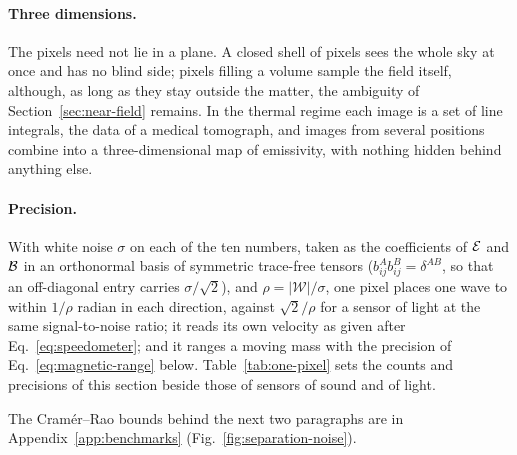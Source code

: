 \paragraph{Three dimensions.} The pixels need not lie in a plane. A closed
shell of pixels sees the whole sky at once and has no blind side; pixels
filling a volume sample the field itself, although, as long as they stay
outside the matter, the ambiguity of Section~\ref{sec:near-field} remains. In
the thermal regime each image is a set of line integrals, the data of a medical
tomograph, and images from several positions combine into a three-dimensional
map of emissivity, with nothing hidden behind anything else.

\paragraph{Precision.} With white noise $\sigma$ on each of the ten numbers,
taken as the coefficients of $\mathcal{E}$ and $\mathcal{B}$ in an orthonormal basis of
symmetric trace-free tensors ($b^A_{ij}b^B_{ij} = \delta^{AB}$, so that an
off-diagonal entry carries $\sigma/\sqrt2$), and $\rho = |\mathcal{W}|/\sigma$, one pixel places one wave to within $1/\rho$ radian in
each direction, against $\sqrt2/\rho$ for a sensor of light at the same
signal-to-noise ratio; it reads its own velocity as given after
Eq.~\eqref{eq:speedometer}; and it ranges a moving mass with the precision of
Eq.~\eqref{eq:magnetic-range} below. Table~\ref{tab:one-pixel} sets the
counts and precisions of this section beside those of sensors of sound and of
light.

The Cram\'er--Rao bounds behind the next two paragraphs are in
Appendix~\ref{app:benchmarks} (Fig.~\ref{fig:separation-noise}).

